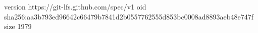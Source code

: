 version https://git-lfs.github.com/spec/v1
oid sha256:aa3b793ed96642c66479b7841d2b0557762555d853bc0008ad8893aeb48e747f
size 1979
